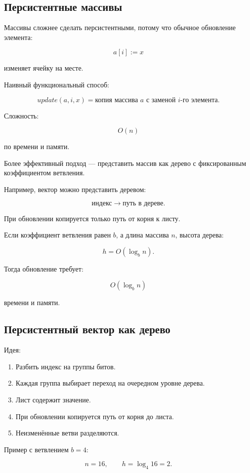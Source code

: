 \documentclass[12pt,a4paper]{article}
\begin{document}
\subsection{Персистентные массивы}

Массивы сложнее сделать персистентными, потому что обычное обновление элемента:

\[
a[i] := x
\]

изменяет ячейку на месте.

Наивный функциональный способ:

\[
update(a,i,x) = \text{копия массива } a \text{ с заменой } i\text{-го элемента}.
\]

Сложность:

\[
O(n)
\]

по времени и памяти.

Более эффективный подход --- представить массив как дерево с фиксированным коэффициентом ветвления.

Например, вектор можно представить деревом:

\[
\text{индекс} \to \text{путь в дереве}.
\]

При обновлении копируется только путь от корня к листу.

Если коэффициент ветвления равен $b$, а длина массива $n$, высота дерева:

\[
h = O(\log_b n).
\]

Тогда обновление требует:

\[
O(\log_b n)
\]

времени и памяти.

\subsection{Персистентный вектор как дерево}

Идея:

\begin{enumerate}
  \item Разбить индекс на группы битов.
  \item Каждая группа выбирает переход на очередном уровне дерева.
  \item Лист содержит значение.
  \item При обновлении копируется путь от корня до листа.
  \item Неизменённые ветви разделяются.
\end{enumerate}

Пример с ветвлением $b = 4$:

\[
n = 16,\qquad h = \log_4 16 = 2.
\]
\end{document}
